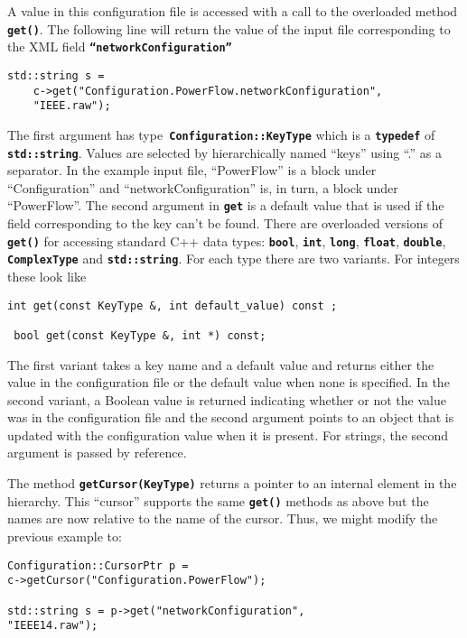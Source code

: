 A value in this configuration file is accessed with a call to the overloaded method \texttt{\textbf{get()}}. The following line will return the value of the input file corresponding to the XML field \texttt{\textbf{``networkConfiguration''}}

{
\color{red}
\begin{Verbatim}[fontseries=b]
std::string s = 
    c->get("Configuration.PowerFlow.networkConfiguration",  
    "IEEE.raw");
\end{Verbatim}
}

The first argument has type\texttt{\textbf{ Configuration::KeyType}} which is a \texttt{\textbf{typedef}} of \texttt{\textbf{std::string}}. Values are selected by hierarchically named ``keys'' using ``.'' as a separator. In the example input file, ``PowerFlow'' is a block under ``Configuration'' and ``networkConfiguration'' is, in turn, a block under ``PowerFlow''. The second argument in \texttt{\textbf{get}} is a default value that is used if the field corresponding to the key can't be found. There are overloaded versions of \texttt{\textbf{get()}} for accessing standard C++ data types: \texttt{\textbf{bool}}, \texttt{\textbf{int}}, \texttt{\textbf{long}}, \texttt{\textbf{float}}, \texttt{\textbf{double}}, \texttt{\textbf{ComplexType}} and \texttt{\textbf{std::string}}. For each type there are two variants. For integers these look like 

{
\color{red}
\begin{Verbatim}[fontseries=b]
 int get(const KeyType &, int default_value) const ;

 bool get(const KeyType &, int *) const;
\end{Verbatim}
}

The first variant takes a key name and a default value and returns either the value in the configuration file or the default value when none is specified. In the second variant, a Boolean value is returned indicating whether or not the value was in the configuration file and the second argument points to an object that is updated with the configuration value when it is present.  For strings, the second argument is passed by reference.  

The method \texttt{\textbf{getCursor(KeyType)}} returns a pointer to an internal element in the hierarchy. This ``cursor'' supports the same \texttt{\textbf{get()}} methods as above but the names are now relative to the name of the  cursor. Thus, we might modify the previous example to:

{
\color{red}
\begin{Verbatim}[fontseries=b]
Configuration::CursorPtr p = 
c->getCursor("Configuration.PowerFlow");

std::string s = p->get("networkConfiguration", 
"IEEE14.raw");
\end{Verbatim}
}

